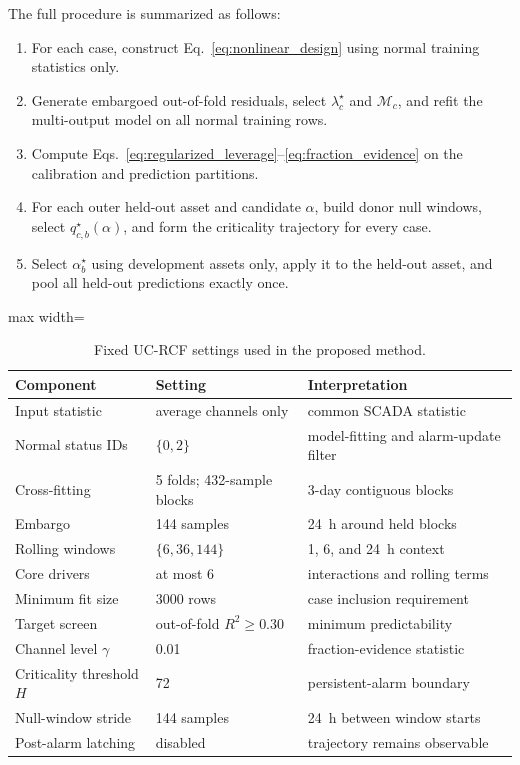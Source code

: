 The full procedure is summarized as follows:
\begin{enumerate}
    \item For each case, construct Eq.~\eqref{eq:nonlinear_design} using normal
    training statistics only.
    \item Generate embargoed out-of-fold residuals, select
    $\lambda_c^{\star}$ and $\mathcal{M}_c$, and refit the multi-output model on
    all normal training rows.
    \item Compute Eqs.~\eqref{eq:regularized_leverage}--\eqref{eq:fraction_evidence}
    on the calibration and prediction partitions.
    \item For each outer held-out asset and candidate $\alpha$, build donor
    null windows, select $q^{\star}_{c,b}(\alpha)$, and form the criticality
    trajectory for every case.
    \item Select $\alpha_b^{\star}$ using development assets only, apply it to
    the held-out asset, and pool all held-out predictions exactly once.
\end{enumerate}

\begin{table}[htbp]
\centering
\small
\caption{Fixed UC-RCF settings used in the proposed method.}
\label{tab:ucrcf_settings}
\begin{adjustbox}{max width=\textwidth}
\begin{tabular}{lll}
\toprule
Component & Setting & Interpretation \\
\midrule
Input statistic & average channels only & common SCADA statistic \\
Normal status IDs & $\{0,2\}$ & model-fitting and alarm-update filter \\
Cross-fitting & 5 folds; 432-sample blocks & 3-day contiguous blocks \\
Embargo & 144 samples & 24~h around held blocks \\
Rolling windows & $\{6,36,144\}$ & 1, 6, and 24~h context \\
Core drivers & at most 6 & interactions and rolling terms \\
Minimum fit size & 3000 rows & case inclusion requirement \\
Target screen & out-of-fold $R^2\geq0.30$ & minimum predictability \\
Channel level $\gamma$ & 0.01 & fraction-evidence statistic \\
Criticality threshold $H$ & 72 & persistent-alarm boundary \\
Null-window stride & 144 samples & 24~h between window starts \\
Post-alarm latching & disabled & trajectory remains observable \\
\bottomrule
\end{tabular}
\end{adjustbox}
\end{table}

